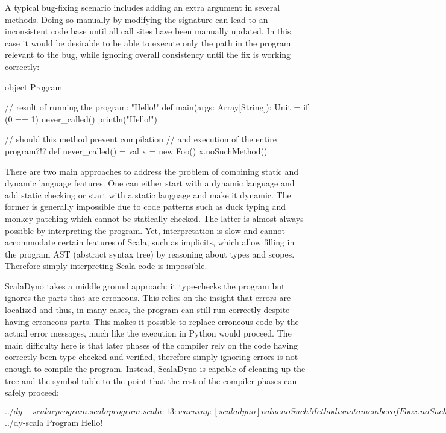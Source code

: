 A typical bug-fixing scenario includes adding an extra argument in several methods. Doing so manually by modifying the signature can lead to an inconsistent code base until all call sites have been manually updated. In this case it would be desirable to be able to execute only the path in the program relevant to the bug, while ignoring overall consistency until the fix is working correctly:

\begin{lstlisting-nobreak}
 object Program {
   // result of running the program: "Hello!"
   def main(args: Array[String]): Unit = {
     if (0 == 1)
       never_called()
     println("Hello!")
   }

   // should this method prevent compilation
   // and execution of the entire program?!?
   def never_called() = {
     val x = new Foo()
     x.noSuchMethod()
   }
 }
\end{lstlisting-nobreak}

There are two main approaches to address the problem of combining static and dynamic language features. One can either start with a dynamic language and add static checking or start with a static language and make it dynamic. The former is generally impossible due to code patterns such as duck typing and monkey patching which cannot be statically checked. The latter is almost always possible by interpreting the program. Yet, interpretation is slow and cannot accommodate certain features of Scala, such as implicits, which allow filling in the program AST (abstract syntax tree) by reasoning about types and scopes. Therefore simply interpreting Scala code is impossible.

ScalaDyno takes a middle ground approach: it type-checks the program but ignores the parts that are erroneous. This relies on the insight that errors are localized and thus, in many cases, the program can still run correctly despite having erroneous parts. This makes it possible to replace erroneous code by the actual error messages, much like the execution in Python would proceed. The main difficulty here is that later phases of the compiler rely on the code having correctly been type-checked and verified, therefore simply ignoring errors is not enough to compile the program. Instead, ScalaDyno is capable of cleaning up the tree and the symbol table to the point that the rest of the compiler phases can safely proceed:

\begin{lstlisting-nobreak}
$ ../dy-scalac program.scala
program.scala:13: warning: [scaladyno] value noSuchMethod is not a member of Foo
     x.noSuchMethod()
       ^
one warning found
$ ../dy-scala Program
Hello!
\end{lstlisting-nobreak}

